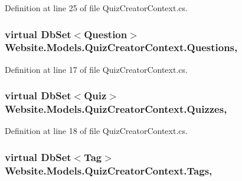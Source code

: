 Definition at line 25 of file Quiz\+Creator\+Context.\+cs.

\hypertarget{class_website_1_1_models_1_1_quiz_creator_context_a9e68b659cc30a902a00f0c396eeee821}{}
\subsubsection[{Questions}]{\setlength{\rightskip}{0pt plus 5cm}virtual Db\+Set$<${\bf Question}$>$ Website.\+Models.\+Quiz\+Creator\+Context.\+Questions\hspace{0.3cm}{\ttfamily [get]}, {\ttfamily [set]}}\label{class_website_1_1_models_1_1_quiz_creator_context_a9e68b659cc30a902a00f0c396eeee821}


Definition at line 17 of file Quiz\+Creator\+Context.\+cs.

\hypertarget{class_website_1_1_models_1_1_quiz_creator_context_a3ab4659584718d73d72375af3b5c803f}{}
\subsubsection[{Quizzes}]{\setlength{\rightskip}{0pt plus 5cm}virtual Db\+Set$<${\bf Quiz}$>$ Website.\+Models.\+Quiz\+Creator\+Context.\+Quizzes\hspace{0.3cm}{\ttfamily [get]}, {\ttfamily [set]}}\label{class_website_1_1_models_1_1_quiz_creator_context_a3ab4659584718d73d72375af3b5c803f}


Definition at line 18 of file Quiz\+Creator\+Context.\+cs.

\hypertarget{class_website_1_1_models_1_1_quiz_creator_context_a56c72441f4de63aef839a5550f160471}{}
\subsubsection[{Tags}]{\setlength{\rightskip}{0pt plus 5cm}virtual Db\+Set$<${\bf Tag}$>$ Website.\+Models.\+Quiz\+Creator\+Context.\+Tags\hspace{0.3cm}{\ttfamily [get]}, {\ttfamily [set]}}\label{class_website_1_1_models_1_1_quiz_creator_context_a56c72441f4de63aef839a5550f160471}


